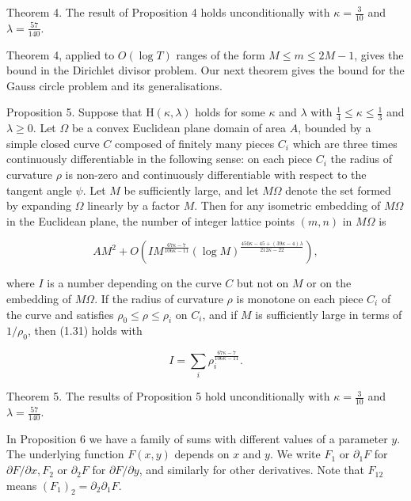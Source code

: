 \documentclass[10pt]{article}
\begin{document}
Theorem 4. The result of Proposition 4 holds unconditionally with $\kappa=\frac{3}{10}$ and $\lambda=\frac{57}{140}$.

Theorem 4, applied to $O(\log T)$ ranges of the form $M \leqslant m \leqslant 2 M-1$, gives the bound in the Dirichlet divisor problem. Our next theorem gives the bound for the Gauss circle problem and its generalisations.

Proposition 5. Suppose that $\mathrm{H}(\kappa, \lambda)$ holds for some $\kappa$ and $\lambda$ with $\frac{1}{4} \leqslant \kappa \leqslant \frac{1}{3}$ and $\lambda \geqslant 0$. Let $\Omega$ be a convex Euclidean plane domain of area $A$, bounded by a simple closed curve $C$ composed of finitely many pieces $C_{i}$ which are three times continuously differentiable in the following sense: on each piece $C_{i}$ the radius of curvature $\rho$ is non-zero and continuously differentiable with respect to the tangent angle $\psi$. Let $M$ be sufficiently large, and let $M \Omega$ denote the set formed by expanding $\Omega$ linearly by a factor $M$. Then for any isometric embedding of $M \Omega$ in the Euclidean plane, the number of integer lattice points $(m, n)$ in $M \Omega$ is


\begin{equation*}
A M^{2}+O\left(I M^{\frac{67 \kappa-7}{106 \kappa-11}}(\log M)^{\frac{450 \kappa-45+(39 \kappa-4) \lambda}{212 \kappa-22}}\right), \tag{1.31}
\end{equation*}


where $I$ is a number depending on the curve $C$ but not on $M$ or on the embedding of $M \Omega$. If the radius of curvature $\rho$ is monotone on each piece $C_{i}$ of the curve and satisfies $\rho_{0} \leqslant \rho \leqslant \rho_{i}$ on $C_{i}$, and if $M$ is sufficiently large in terms of $1 / \rho_{0}$, then (1.31) holds with

$$
I=\sum_{i} \rho_{i}^{\frac{67 \kappa-7}{106 \kappa-11}}.
$$

Theorem 5. The results of Proposition 5 hold unconditionally with $\kappa=\frac{3}{10}$ and $\lambda=\frac{57}{140}$.

In Proposition 6 we have a family of sums with different values of a parameter $y$. The underlying function $F(x, y)$ depends on $x$ and $y$. We write $F_{1}$ or $\partial_{1} F$ for $\partial F / \partial x, F_{2}$ or $\partial_{2} F$ for $\partial F / \partial y$, and similarly for other derivatives. Note that $F_{12}$ means $\left(F_{1}\right)_{2}=\partial_{2} \partial_{1} F$.
\end{document}

